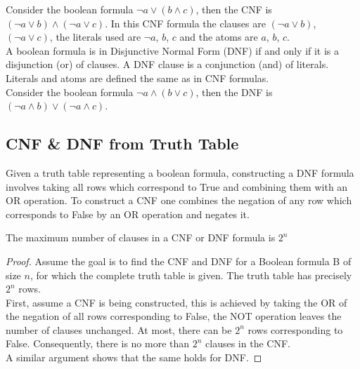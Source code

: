 Consider the boolean formula $\lnot a \lor (b \land c)$, then the CNF is $(\lnot a \lor b) \land (\lnot a \lor c)$. In this CNF formula the clauses are $(\lnot a \lor b)$, $(\lnot a \lor c)$, the literals used are $\lnot a$, $b$, $c$ and the atoms are $a$, $b$, $c$.\\

A boolean formula is in Disjunctive Normal Form (DNF) if and only if it is a disjunction (or) of clauses. A DNF clause is a conjunction (and) of literals. Literals and atoms are defined the same as in CNF formulas.\\

Consider the boolean formula $\lnot a \land (b \lor c)$, then the DNF is $(\lnot a \land b) \lor (\lnot a \land c)$.\\

\subsection{CNF \& DNF from Truth Table} \label{subsec:construct-cnfdnf}
Given a truth table representing a boolean formula, constructing a DNF formula involves taking all rows which correspond to True and combining them with an OR operation. To construct a CNF one combines the negation of any row which corresponds to False by an OR operation and negates it.

\begin{theorem}
	The maximum number of clauses in a CNF or DNF formula is $2^n$
	\label{thm:max-clause-cnfdnf}
\end{theorem}

\begin{proof}
	Assume the goal is to find the CNF and DNF for a Boolean formula B of size $n$, for which the complete truth table is given. The truth table has precisely $2^n$ rows.\\
	
	First, assume a CNF is being constructed, this is achieved by taking the OR of the negation of all rows corresponding to False, the NOT operation leaves the number of clauses unchanged. At most, there can be $2^n$ rows corresponding to False. Consequently, there is no more than $2^n$ clauses in the CNF.\\
	
	A similar argument shows that the same holds for DNF.
\end{proof}

